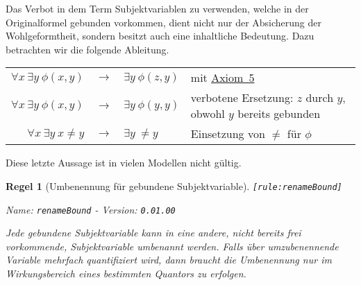 \documentclass[a4paper,german,10pt,twoside]{book}
\newtheorem{rul}{Regel}
\theoremstyle{definition}
\theoremstyle{remark}
\begin{document}
Das Verbot in dem Term Subjektvariablen zu verwenden, welche in der Originalformel gebunden vorkommen, dient nicht nur der Absicherung der Wohlgeformtheit, sondern besitzt auch eine inhaltliche Bedeutung. Dazu betrachten wir die folgende Ableitung.

\par
\begin{tabularx}{\linewidth}{rclX}
  $\forall x \ \exists y \ \phi(x, y)$ & $\rightarrow$ & $\exists y \ \phi(z,y)$ 
    & mit \hyperlink{axiom:universalInstantiation}{Axiom~5} \\
  $\forall x \ \exists y \ \phi(x, y)$ & $\rightarrow$ & $\exists y \ \phi(y,y)$ 
    & verbotene Ersetzung: $z$ durch $y$, obwohl $y$ bereits gebunden \\
  $\forall x \ \exists y \ x \neq y$ & $\rightarrow$ & $\exists y \ \neq y$ 
    &  Einsetzung von $\neq$ f{\"u}r $\phi$
\end{tabularx}

\par
Diese letzte Aussage ist in vielen Modellen nicht g{\"u}ltig.


\begin{rul}[Umbenennung f{\"u}r gebundene Subjektvariable]
\label{rule:renameBound} \hypertarget{rule:renameBound}{}
{\tt \tiny [\verb]rule:renameBound]]}

\par
{\em   Name: \verb]renameBound]  -  Version: \verb]0.01.00]}


Jede gebundene Subjektvariable kann in eine andere, nicht bereits frei vorkommende, Subjektvariable umbenannt werden. Falls {\"u}ber umzubenennende Variable mehrfach quantifiziert wird, dann braucht die Umbenennung nur im Wirkungsbereich eines bestimmten Quantors zu erfolgen.
\end{rul}
\end{document}
